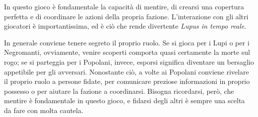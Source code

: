 \documentclass[a4paper,10pt]{article}
\begin{document}
In questo gioco è fondamentale la capacità di mentire, di crearsi una copertura
perfetta e di coordinare le azioni della propria fazione. L'interazione con gli altri
giocatori è importantissima, ed è ciò che rende divertente \emph{Lupus in tempo reale}.

In generale conviene tenere segreto il proprio ruolo. Se si gioca per i Lupi o per i Negromanti,
ovviamente, venire scoperti comporta quasi certamente la morte sul rogo; se si parteggia per i
Popolani, invece, esporsi significa diventare un bersaglio appetibile per gli avversari.
Nonostante ciò, a volte ai Popolani conviene rivelare il proprio ruolo a persone fidate, per
comunicare preziose informazioni in proprio possesso o per aiutare la fazione a coordinarsi.
Bisogna ricordarsi, però, che mentire è fondamentale in questo gioco, e fidarsi degli altri è
sempre una scelta da fare con molta cautela.
\end{document}
